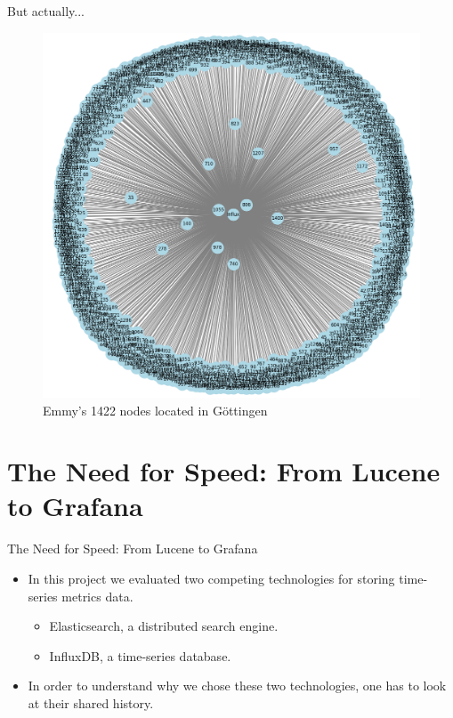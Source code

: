 \documentclass[compress,aspectratio=169]{beamer}
\begin{document}
\begin{frame}{But actually...}
\begin{center}
\begin{figure}
  \includegraphics[height=.8\textheight]{assets/monitoring_system_architecture_2.png}
  \caption{Emmy's 1422 nodes located in G\"ottingen}
\end{figure}
\end{center}
\end{frame}

\section[Overview]{The Need for Speed: From Lucene to Grafana}
\begin{frame}{The Need for Speed: From Lucene to Grafana}
  \begin{itemize}
    \item In this project we evaluated two competing technologies for storing time-series metrics data.
    \begin{itemize}
      \item Elasticsearch, a distributed search engine.
      \item InfluxDB, a time-series database.
    \end{itemize}
  \item In order to understand why we chose these two technologies, one has to look at their shared history.
  \end{itemize}
\end{frame}
\end{document}
